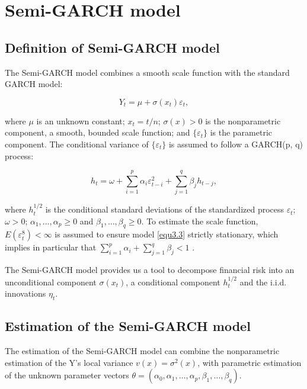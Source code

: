 \section{Semi-GARCH model}

\subsection{Definition of Semi-GARCH model}

The Semi-GARCH model combines a smooth scale function with the standard GARCH model:

\begin{equation}
\label{eq:3.1}
Y_{t} = \mu + \sigma(x_{t})\varepsilon_{t},
\end{equation}

where $\mu$ is an unknown constant; $x_{t}=t/n$; $\sigma(x)>0$ is the nonparametric component, a smooth, bounded scale function; and $\lbrace\varepsilon_{t}\rbrace$ is the parametric component. The conditional variance of $\lbrace\varepsilon_{t}\rbrace$ is assumed to follow a GARCH(p, q) process:

\begin{equation}
\label{equ3.3}
h_{t}=\omega + \sum_{i=1}^{p}\alpha_{i}\varepsilon_{t-i}^{2} + \sum_{j=1}^{q}\beta_{j}h_{t-j},
\end{equation}

where $h_t^{1/2}$ is the conditional standard deviations of the standardized process $\varepsilon_t$; $ \omega>0$; $\alpha_{1}, \ldots ,\alpha_{p}\geq0$ and $\beta_{1},\ldots,\beta_{q}\geq0$.  To estimate the scale function, $E(\varepsilon_{t}^{8})<\infty$ is assumed to ensure model \ref{equ3.3} strictly stationary, which implies in particular that $\sum_{i=1}^p\alpha_i+\sum_{j=1}^q\beta_j<1$ \citep{Feng2004}.

The Semi-GARCH model provides us a tool to decompose financial risk into an unconditional component $\sigma(x_t)$, a conditional component $h_{t}^{1/2}$ and the i.i.d. innovations $\eta_{t}$.

\subsection{Estimation of the Semi-GARCH model}
\label{subsec3.1.2}
The estimation of the Semi-GARCH model can combine the nonparametric estimation of the Y's local variance $v(x)=\sigma^{2}(x)$, with parametric estimation of the unknown parameter vectors $\theta = (\alpha_{0},\alpha_{1},\ldots,\alpha_{p},\beta_{1},\ldots,\beta_{q})$.

